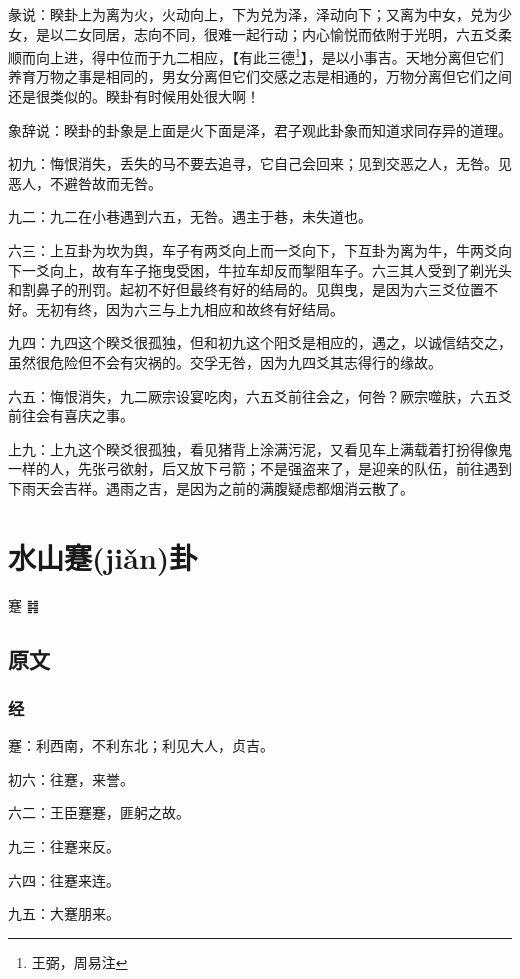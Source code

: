 \documentclass[12pt,oneside]{book}
\begin{document}
彖说：睽卦上为离为火，火动向上，下为兑为泽，泽动向下；又离为中女，兑为少女，是以二女同居，志向不同，很难一起行动；内心愉悦而依附于光明，六五爻柔顺而向上进，得中位而于九二相应，【有此三德\footnote{王弼，周易注}】，是以小事吉。天地分离但它们养育万物之事是相同的，男女分离但它们交感之志是相通的，万物分离但它们之间还是很类似的。睽卦有时候用处很大啊！

象辞说：睽卦的卦象是上面是火下面是泽，君子观此卦象而知道求同存异的道理。


初九：悔恨消失，丢失的马不要去追寻，它自己会回来；见到交恶之人，无咎。见恶人，不避咎故而无咎。

九二：九二在小巷遇到六五，无咎。遇主于巷，未失道也。

六三：上互卦为坎为舆，车子有两爻向上而一爻向下，下互卦为离为牛，牛两爻向下一爻向上，故有车子拖曳受困，牛拉车却反而掣阻车子。六三其人受到了剃光头和割鼻子的刑罚。起初不好但最终有好的结局的。见舆曳，是因为六三爻位置不好。无初有终，因为六三与上九相应和故终有好结局。

九四：九四这个睽爻很孤独，但和初九这个阳爻是相应的，遇之，以诚信结交之，虽然很危险但不会有灾祸的。交孚无咎，因为九四爻其志得行的缘故。

六五：悔恨消失，九二厥宗设宴吃肉，六五爻前往会之，何咎？厥宗噬肤，六五爻前往会有喜庆之事。

上九：上九这个睽爻很孤独，看见猪背上涂满污泥，又看见车上满载着打扮得像鬼一样的人，先张弓欲射，后又放下弓箭；不是强盗来了，是迎亲的队伍，前往遇到下雨天会吉祥。遇雨之吉，是因为之前的满腹疑虑都烟消云散了。


\chapter{水山蹇(jiǎn)卦}
蹇 {\Large ䷦}

\section{原文}

\subsection{经}
蹇：利西南，不利东北；利见大人，贞吉。

初六：往蹇，来誉。

六二：王臣蹇蹇，匪躬之故。

九三：往蹇来反。

六四：往蹇来连。

九五：大蹇朋来。
\end{document}
